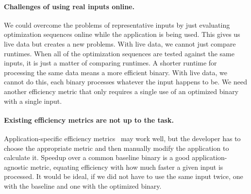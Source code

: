 
    \paragraph{Challenges of using real inputs online.} We could overcome the problems of representative inputs by just evaluating
    optimization sequences online while the application is being used. 
    This gives us live data but creates a new problems.
    With live data, we cannot just compare runtimes. 
    When all of the optimization sequences are tested against the same inputs, it is just a matter of comparing runtimes.
    A shorter runtime for processing the same data means a more efficient binary.
    With live data, we cannot do this, each binary processes
    whatever the input happens to be. We need another efficiency metric that only requires a single use of an optimized binary with a
    single input.

    \paragraph{Existing efficiency metrics are not up to the task.} Application-specific efficiency metrics~\cite{alameldeen06,coppa14} may
    work well, but the developer has to choose the appropriate metric and then manually modify the application to calculate it. Speedup
    over a common baseline binary is a good application-agnostic metric, equating efficiency with how much faster a given input is
    processed. It would be ideal, if we did not have to use the same input twice, one with the baseline and one with the optimized binary.

